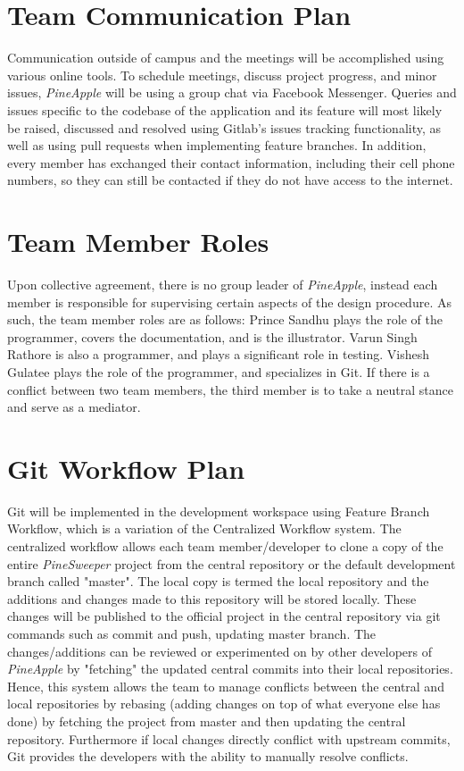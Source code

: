 \documentclass{article}
\begin{document}
\section{Team Communication Plan}

Communication outside of campus and the meetings will be accomplished using various online tools. To schedule meetings, discuss project
progress, and minor issues, \textit{PineApple} will be using a group chat via Facebook Messenger. Queries and issues specific to the
codebase of the application and its feature will most likely be raised, discussed and resolved using Gitlab's issues tracking functionality, as
well as using pull requests when implementing feature branches. In addition, every member has exchanged their contact information,
including their cell phone numbers, so they can still be contacted if they do not have access to the internet. 

\section{Team Member Roles}

Upon collective agreement, there is no group leader of \textit{PineApple}, instead each member is responsible for supervising certain
aspects of the design procedure. As such, the team member roles are as follows: Prince Sandhu plays the role of the programmer, covers
the documentation, and is the illustrator. Varun Singh Rathore is also a programmer, and plays a significant role in testing. Vishesh Gulatee
plays the role of the programmer, and specializes in Git. If there is a conflict between two team members, the third member is to take a
neutral stance and serve as a mediator.

\section{Git Workflow Plan}

Git will be implemented in the development workspace using Feature Branch Workflow, which is a variation of the Centralized Workflow
system. The centralized workflow allows each team member/developer to clone a copy of the entire \textit{PineSweeper} project from the
central repository or the default development branch called "master". The local copy is termed the local repository and the additions and
changes made to this repository will be stored locally. These changes will be published to the official project in the central repository via git
commands such as commit and push, updating master branch. The changes/additions can be reviewed or experimented on by other
developers of \textit{PineApple} by "fetching" the updated central commits into their local repositories. Hence, this system allows the team to
manage conflicts between the central and local repositories by rebasing (adding changes on top of  what everyone else has done) by
fetching the project from master and then updating the central repository. Furthermore if local changes directly conflict with upstream
commits, Git provides the developers with the ability to manually resolve conflicts.
\end{document}
